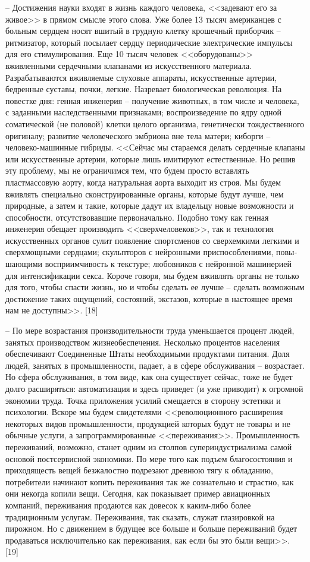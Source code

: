 \documentclass{book}
\begin{document}
{-- Достижения науки входят в жизнь каждого человека, <<задевают его за живое>> в прямом смысле этого слова. Уже бо­лее 13 тысяч американцев с больным сердцем носят вшитый в грудную клетку крошечный приборчик -- ритмизатор, который посылает сердцу периодические электрические импульсы для его стимулирования. Еще 10 тысяч человек <<оборудованы>> вживленными сердечными клапанами из искусственного материала. Разрабатываются вживляемые слуховые аппараты, искусственные артерии, бедренные суставы, почки, легкие. Назревает биологическая революция. На повестке дня: генная инже­нерия -- получение животных, в том числе и человека, с заданными наследственными признаками; воспроизведение по ядру одной соматической (не половой) клетки целого организма, генетически тождественного оригиналу; развитие человеческого эмбриона вне тела матери; киборги -- человеко-машинные гибриды. <<Сейчас мы стараемся делать сердечные клапаны или искусственные артерии, которые лишь имитируют естественные. Но решив эту проблему, мы не ограничимся тем, что будем просто вставлять пластмассовую аорту, когда натуральная аорта выходит из строя. Мы будем вживлять специально сконструированные органы, которые будут лучше,  чем природные, а затем и такие, которые дадут их владельцу новые возможности и способности, отсутствовавшие первоначально. Подобно тому как генная инженерия обещает производить <<сверхчеловеков>>, так и технология искусственных органов сулит появление спортсменов со сверхемкими легкими и сверхмощными серд­цами; скульпторов с нейронными приспособлениями, повы­шающими восприимчивость к текстуре; любовников с ней­ронной машинерией для интенсификации секса. Короче говоря, мы будем вживлять органы не только для того, чтобы спасти жизнь, но и чтобы сделать ее лучше -- сделать возможным дости­жение таких ощущений, состояний, экстазов, которые в насто­ящее время нам не доступны>>. [18]

-- По мере возрастания производительности труда уменьша­ется процент людей, занятых производством жизнеобеспечения. Несколько процентов населения обеспечивают Соединен­ные Штаты необходимыми продуктами питания. Доля людей, занятых в промышленности, падает, а в сфере обслуживания -- возрастает. Но сфера обслуживания, в том виде, как она су­ществует сейчас, тоже не будет долго расширяться: автомати­зация и здесь приведет (и уже приводит) к огромной экономии труда. Точка приложения усилий смещается в сторону эстетики и психологии. Вскоре мы будем свидетелями <<революционного расширения некоторых видов промышленности, продукцией которых будут не товары и не обычные услуги, а запрограммированные <<переживания>>. Промышленность переживаний, возможно, станет одним из столпов супериндустриализма самой основой постсервисной экономики. По мере того как подъем благосостояния и приходящесть вещей безжалостно подрезают древнюю тягу к обладанию, потребители начинают копить переживания так же сознательно и страстно, как они 
некогда копили вещи. Сегодня, как показывает пример авиаци­онных компаний, переживания продаются как довесок к каким-либо более традиционным услугам. Переживания, так сказать, служат глазировкой на пирожном. Но с движением в будущее все больше и больше переживаний будет продаваться исклю­чительно как переживания, как если бы это были вещи>>. [19]

}
\end{document}
